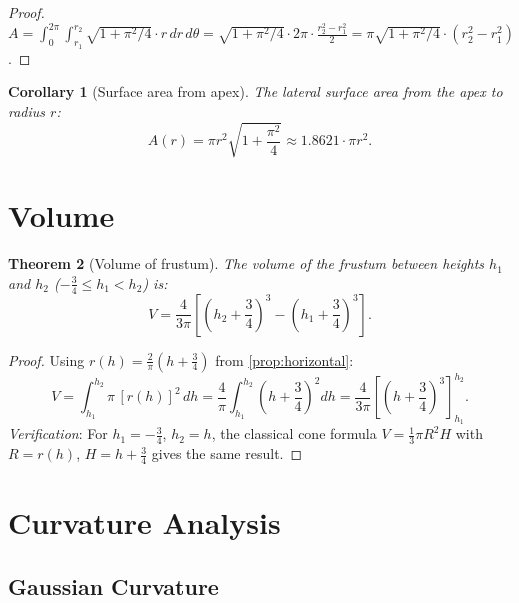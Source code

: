 \documentclass[12pt,a4paper]{article}
\theoremstyle{plain}
\newtheorem{theorem}{Theorem}[section]
\newtheorem{corollary}[theorem]{Corollary}
\theoremstyle{definition}
\theoremstyle{remark}
\begin{document}
\begin{proof}
$A = \int_0^{2\pi}\!\int_{r_1}^{r_2}\sqrt{1+\pi^2/4}\cdot r\,dr\,d\theta
= \sqrt{1+\pi^2/4}\cdot 2\pi\cdot\tfrac{r_2^2-r_1^2}{2}
= \pi\sqrt{1+\pi^2/4}\cdot(r_2^2-r_1^2)$.
\end{proof}

\begin{corollary}[Surface area from apex]\label{cor:surface_from_apex}
The lateral surface area from the apex to radius $r$:
\begin{equation}\label{eq:surface_apex}
A(r) = \pi r^2\sqrt{1+\frac{\pi^2}{4}} \approx 1.8621\cdot\pi r^2.
\end{equation}
\end{corollary}

\section{Volume}

\begin{theorem}[Volume of frustum]\label{thm:volume}
The volume of the frustum between heights $h_1$ and $h_2$
($-\tfrac{3}{4}\leq h_1<h_2$) is:
\begin{equation}\label{eq:volume}
V = \frac{4}{3\pi}\left[\left(h_2+\frac{3}{4}\right)^3 - \left(h_1+\frac{3}{4}\right)^3\right].
\end{equation}
\end{theorem}

\begin{proof}
Using $r(h) = \tfrac{2}{\pi}(h+\tfrac{3}{4})$ from \cref{prop:horizontal}:
\[
V = \int_{h_1}^{h_2}\pi\,[r(h)]^2\,dh
= \frac{4}{\pi}\int_{h_1}^{h_2}\!\left(h+\frac{3}{4}\right)^2 dh
= \frac{4}{3\pi}\!\left[\left(h+\frac{3}{4}\right)^3\right]_{h_1}^{h_2}.
\]
\textit{Verification}: For $h_1=-\tfrac{3}{4}$, $h_2=h$, the classical cone formula
$V=\tfrac{1}{3}\pi R^2 H$ with $R=r(h)$, $H=h+\tfrac{3}{4}$ gives the same result.
\end{proof}

\section{Curvature Analysis}

\subsection{Gaussian Curvature}
\end{document}
